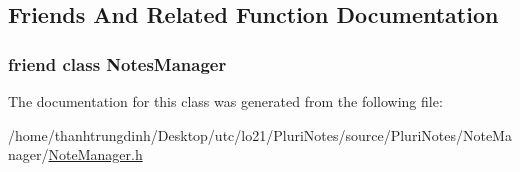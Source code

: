\subsection{Friends And Related Function Documentation}
\subsubsection[{\texorpdfstring{Notes\+Manager}{NotesManager}}]{\setlength{\rightskip}{0pt plus 5cm}friend class {\bf Notes\+Manager}\hspace{0.3cm}{\ttfamily [friend]}}\hypertarget{classNotesManager_1_1Const__Iterator_a017a5144e8cfa6087305055ab968ef41}{}\label{classNotesManager_1_1Const__Iterator_a017a5144e8cfa6087305055ab968ef41}


The documentation for this class was generated from the following file\+:\begin{DoxyCompactItemize}
\item 
/home/thanhtrungdinh/\+Desktop/utc/lo21/\+Pluri\+Notes/source/\+Pluri\+Notes/\+Note\+Manager/\hyperlink{NoteManager_8h}{Note\+Manager.\+h}\end{DoxyCompactItemize}
